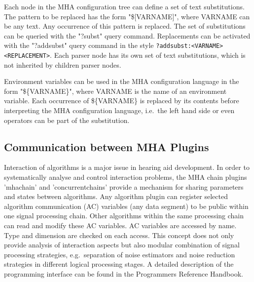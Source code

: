 Each node in the MHA configuration tree can define a set of text
substitutions.  The pattern to be replaced has the form "\$[VARNAME]",
where VARNAME can be any text. Any occurrence of this pattern is
replaced. The set of substitutions can be queried with the "?subst"
query command. Replacements can be activated with the "?addsubst"
query command in the style
\verb!?addsubst:<VARNAME> <REPLACEMENT>!. Each parser node has its own
set of text substitutions, which is not inherited by children parser
nodes.

Environment variables can be used in the MHA configuration language in the form
"\$\{VARNAME\}", where VARNAME is the name of an environment variable. Each
occurrence of \$\{VARNAME\} is replaced by its contents before interpreting the
MHA configuration language, i.e.\ the left hand side or even operators can be part of
the substitution.

\subsection{Communication between MHA Plugins}

Interaction of algorithms is a major issue in hearing aid
development. In order to systematically analyse and control
interaction problems, the MHA chain plugins 'mhachain' and
'concurrentchains' provide a mechanism for sharing parameters and
states between algorithms. Any algorithm plugin can register selected
algorithm communication (AC) variables (any data segment) to be public
within one signal processing
chain. Other algorithms within the same processing chain can read and
modify these AC variables. AC variables are accessed by name. Type and
dimension are checked on each access. This concept does not only
provide analysis of interaction aspects but also modular combination
of signal processing strategies, e.g.\ separation of noise estimators
and noise reduction strategies in different logical processing
stages. A detailed description of the programming interface can be
found in the Programmers Reference Handbook.


